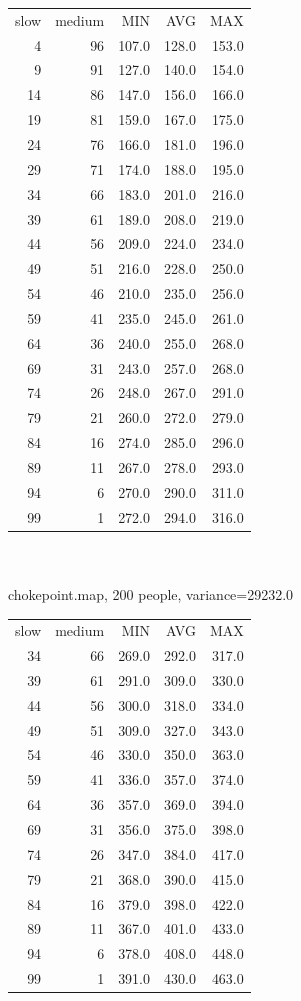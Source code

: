 \documentclass[12pt,letterpaper]{article}
\begin{document}
\begin{tabular}{ r | r | r | r | r }
slow & medium & MIN   & AVG   & MAX \\
   4 & 96     & 107.0 & 128.0 & 153.0 \\
   9 & 91     & 127.0 & 140.0 & 154.0 \\
  14 & 86     & 147.0 & 156.0 & 166.0 \\
  19 & 81     & 159.0 & 167.0 & 175.0 \\
  24 & 76     & 166.0 & 181.0 & 196.0 \\
  29 & 71     & 174.0 & 188.0 & 195.0 \\
  34 & 66     & 183.0 & 201.0 & 216.0 \\
  39 & 61     & 189.0 & 208.0 & 219.0 \\
  44 & 56     & 209.0 & 224.0 & 234.0 \\
  49 & 51     & 216.0 & 228.0 & 250.0 \\
  54 & 46     & 210.0 & 235.0 & 256.0 \\
  59 & 41     & 235.0 & 245.0 & 261.0 \\
  64 & 36     & 240.0 & 255.0 & 268.0 \\
  69 & 31     & 243.0 & 257.0 & 268.0 \\
  74 & 26     & 248.0 & 267.0 & 291.0 \\
  79 & 21     & 260.0 & 272.0 & 279.0 \\
  84 & 16     & 274.0 & 285.0 & 296.0 \\
  89 & 11     & 267.0 & 278.0 & 293.0 \\
  94 &  6     & 270.0 & 290.0 & 311.0 \\
  99 &  1     & 272.0 & 294.0 & 316.0 \\
\end{tabular}  
\\
\\
chokepoint.map, 200 people, variance=29232.0
\begin{tabular}{ r | r | r | r | r }
slow & medium & MIN   & AVG   & MAX   \\
34   & 66     & 269.0 & 292.0 & 317.0 \\
39   & 61     & 291.0 & 309.0 & 330.0 \\
44   & 56     & 300.0 & 318.0 & 334.0 \\
49   & 51     & 309.0 & 327.0 & 343.0 \\
54   & 46     & 330.0 & 350.0 & 363.0 \\
59   & 41     & 336.0 & 357.0 & 374.0 \\
64   & 36     & 357.0 & 369.0 & 394.0 \\
69   & 31     & 356.0 & 375.0 & 398.0 \\
74   & 26     & 347.0 & 384.0 & 417.0 \\
79   & 21     & 368.0 & 390.0 & 415.0 \\
84   & 16     & 379.0 & 398.0 & 422.0 \\
89   & 11     & 367.0 & 401.0 & 433.0 \\
94   &  6     & 378.0 & 408.0 & 448.0 \\
99   &  1     & 391.0 & 430.0 & 463.0 \\
\end{tabular}  
\end{document}
